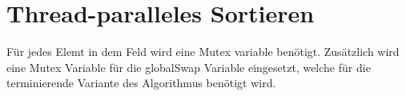 \documentclass[12pt,a4paper]{article}
\begin{document}
\section{Thread-paralleles Sortieren}
Für jedes Elemt in dem Feld wird eine Mutex variable benötigt. Zusätzlich wird eine Mutex Variable für die globalSwap Variable eingesetzt, welche für die terminierende Variante des Algorithmus benötigt wird.

\end{document}
